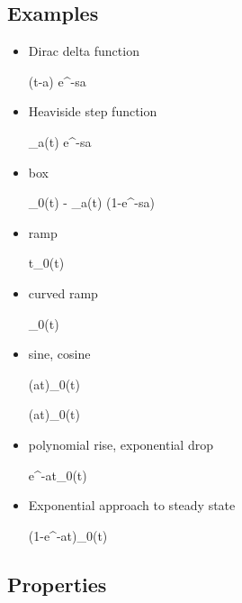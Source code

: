 \subsection{Examples}
\begin{itemize}

\item
Dirac delta function

\beq
\delta(t-a)
\maparrow{\call}
e^{-sa}
\eeq

\item
Heaviside step function



\beq
\heavy_a(t)
\maparrow{\call}
e^{-sa}\quad {}
\eeq

\item box

\beq
\heavy_0(t) - \heavy_a(t)
\maparrow{\call} 
(1-e^{-sa})\quad{}
\eeq

\item ramp

\beq
t\;\heavy_0(t)
\maparrow{\call}
\quad{}
\eeq

\item curved ramp

\beq
{}\heavy_0(t)
\maparrow{\call}
\quad {}
\eeq

\item sine, cosine

\beq
\sin(at)\heavy_0(t) \maparrow{\call}
\eeq

\beq
\cos(at)\heavy_0(t) \maparrow{\call}
\eeq

\item
polynomial rise, exponential drop

\beq
{}e^{-at}\;\heavy_0(t)
\maparrow{\call}
\quad{}
\eeq

\item Exponential approach to steady state

\beq
(1-e^{-at})\heavy_0(t)
\maparrow{\call}
\quad {}
\eeq
\end{itemize}

\subsection{Properties}

